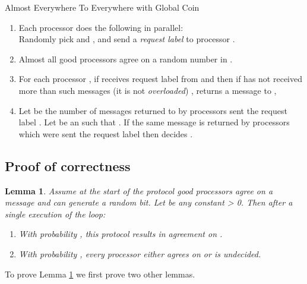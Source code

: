 \documentclass[letterpaper,11pt]{article}
\newtheorem{lemma}{Lemma}
\begin{document}
\begin{algorithm}

\caption{Almost Everywhere To Everywhere with Global Coin}

\begin{enumerate}

\item
Each processor  does the following in parallel:  \\
Randomly pick   and ,  and send  a {\it request label}  to processor .
\item \label{random}
Almost all good processors agree on a random number   in .

\item \label{received}
For each processor , if  receives request label  from   and  then  
if  has not received more than  such messages (it is not {\it overloaded}) ,  
 returns  a message to , 
\item \label{majority}
Let   be the number of messages returned to  by processors sent the request label . Let  be an  such that  . If  the same message   is  returned by   processors which  were sent the request label  then  decides  .


\end{enumerate}
\end{algorithm}

\subsection{Proof of correctness}

\begin{lemma}\label{singleLoop}
Assume at the start of the protocol  good processors agree on a message  and can generate a  random bit.  Let  be any constant > 0. Then after a single execution of the loop:
\begin{enumerate}
\item
With probability , this protocol results in agreement on . 
\item
With probability , every processor either agrees on  or is undecided.
\end{enumerate}
\end{lemma} 


To prove Lemma \ref{singleLoop} we first prove two other lemmas.
 
\end{document}
